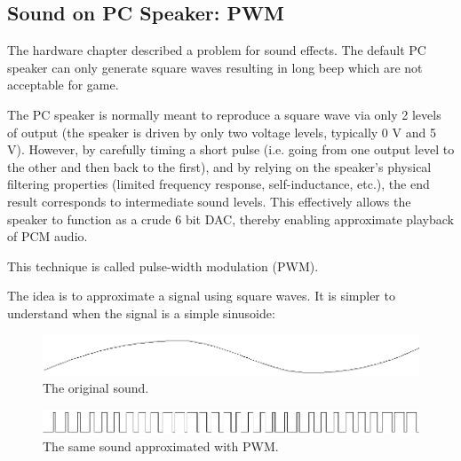  
\subsection{Sound on PC Speaker: PWM}
The hardware chapter described a problem for sound effects. The default PC speaker can only generate square waves resulting in long beep which are not acceptable for game.\\

\par
 \begin{fancyquotes}
  The PC speaker is normally meant to reproduce a square wave via only 2 levels of output (the speaker is driven by only two voltage levels, typically 0 V and 5 V). However, by carefully timing a short pulse (i.e. going from one output level to the other and then back to the first), and by relying on the speaker's physical filtering properties (limited frequency response, self-inductance, etc.), the end result corresponds to intermediate sound levels. This effectively allows the speaker to function as a crude 6 bit DAC, thereby enabling approximate playback of PCM audio.\\
  \par
  This technique is called pulse-width modulation (PWM).
 \end{fancyquotes}
\par
  
The idea is to approximate a signal using square waves. It is simpler to understand when the signal is a simple sinusoide:
\par
\begin{figure}[H]
\centering
 \includegraphics[width=\textwidth]{imgs/drawings/pwm/sinuois.png}
 \caption{The original sound.}
 \end{figure}
\par

\par
\begin{figure}[H]
\centering
 \includegraphics[width=\textwidth]{imgs/drawings/pwm/pwm_approximation.png}
 \caption{The same sound approximated with PWM.}
 \end{figure}
\par

